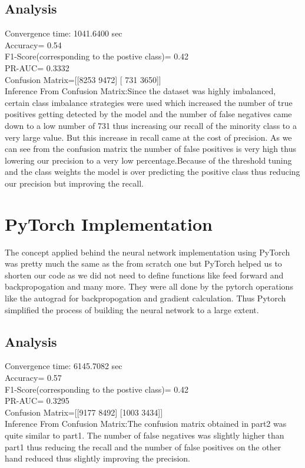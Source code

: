 \documentclass[12pt]{article}
\begin{document}
\subsection{Analysis}
Convergence time: 1041.6400 sec\\
Accuracy=  0.54\\
F1-Score(corresponding to the postive class)= 0.42\\
PR-AUC= 0.3332\\
Confusion Matrix=[[8253 9472]
 [ 731 3650]]\\
Inference From Confusion Matrix:Since the dataset was highly imbalanced, certain class imbalance strategies were used which increased the number of true positives getting detected by the model and the number of false negatives came down to a low number of 731 thus increasing our recall of the minority class to a very large value.
But this increase in recall came at the cost of precision. As we can see from the confusion matrix the number of false positives is very high thus lowering our precision to a very low percentage.Because of the threshold tuning and the class weights the model is over predicting the positive class thus reducing our precision but improving the recall.
\section{PyTorch Implementation}
The concept applied behind the neural network implementation using PyTorch was pretty much the same as the from scratch one but PyTorch helped us to shorten our code as we did not need to define functions like feed forward and backpropogation and many more. They were all done by the pytorch operations like the autograd for backpropogation and gradient calculation.
Thus Pytorch simplified the process of building the neural network to a large extent.
\subsection{Analysis}
Convergence time: 6145.7082 sec\\
Accuracy=  0.57\\
F1-Score(corresponding to the postive class)=  0.42\\
PR-AUC=   0.3295\\
Confusion Matrix=[[9177 8492]
 [1003 3434]]\\
Inference From Confusion Matrix:The confusion matrix obtained in part2 was quite similar to part1. The number of false negatives was slightly higher than part1 thus reducing the recall and the number of false positives on the other hand reduced thus slightly improving the precision.
\end{document}

